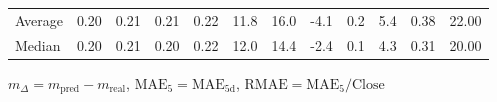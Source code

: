 \begin{threeparttable}
{\begin{tabular}{lrrrrrrrrrrr}
Average &          0.20 &          0.21 &          0.21 &        0.22 &                11.8 &                16.0 &       -4.1 &                 0.2 &              5.4 &            0.38 &                  22.00 \\
 Median &          0.20 &          0.21 &          0.20 &        0.22 &                12.0 &                14.4 &       -2.4 &                 0.1 &              4.3 &            0.31 &                  20.00 \\
\bottomrule
\end{tabular}
}
\begin{tablenotes}\footnotesize
\item $m_\Delta=m_{\text{pred}}-m_{\text{real}}$,
$\mathrm{MAE}_5=\mathrm{MAE}_{5\text{d}}$,
$\mathrm{RMAE}=\mathrm{MAE}_5/\text{Close}$
\end{tablenotes}
\end{threeparttable}
\endgroup

